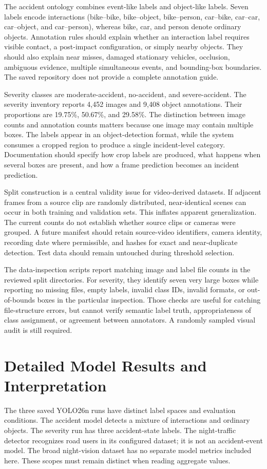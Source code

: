 \documentclass[12pt,a4paper]{article}
\begin{document}
The accident ontology combines event-like labels and object-like labels. Seven labels encode interactions (bike--bike, bike--object, bike--person, car--bike, car--car, car--object, and car--person), whereas bike, car, and person denote ordinary objects. Annotation rules should explain whether an interaction label requires visible contact, a post-impact configuration, or simply nearby objects. They should also explain near misses, damaged stationary vehicles, occlusion, ambiguous evidence, multiple simultaneous events, and bounding-box boundaries. The saved repository does not provide a complete annotation guide.

Severity classes are moderate-accident, no-accident, and severe-accident. The severity inventory reports 4,452 images and 9,408 object annotations. Their proportions are 19.75\%, 50.67\%, and 29.58\%. The distinction between image counts and annotation counts matters because one image may contain multiple boxes. The labels appear in an object-detection format, while the system consumes a cropped region to produce a single incident-level category. Documentation should specify how crop labels are produced, what happens when several boxes are present, and how a frame prediction becomes an incident prediction.

Split construction is a central validity issue for video-derived datasets. If adjacent frames from a source clip are randomly distributed, near-identical scenes can occur in both training and validation sets. This inflates apparent generalization. The current counts do not establish whether source clips or cameras were grouped. A future manifest should retain source-video identifiers, camera identity, recording date where permissible, and hashes for exact and near-duplicate detection. Test data should remain untouched during threshold selection.

The data-inspection scripts report matching image and label file counts in the reviewed split directories. For severity, they identify seven very large boxes while reporting no missing files, empty labels, invalid class IDs, invalid formats, or out-of-bounds boxes in the particular inspection. Those checks are useful for catching file-structure errors, but cannot verify semantic label truth, appropriateness of class assignment, or agreement between annotators. A randomly sampled visual audit is still required.

\section{Detailed Model Results and Interpretation}
The three saved YOLO26n runs have distinct label spaces and evaluation conditions. The accident model detects a mixture of interactions and ordinary objects. The severity run has three accident-state labels. The night-traffic detector recognizes road users in its configured dataset; it is not an accident-event model. The broad night-vision dataset has no separate model metrics included here. These scopes must remain distinct when reading aggregate values.
\end{document}

